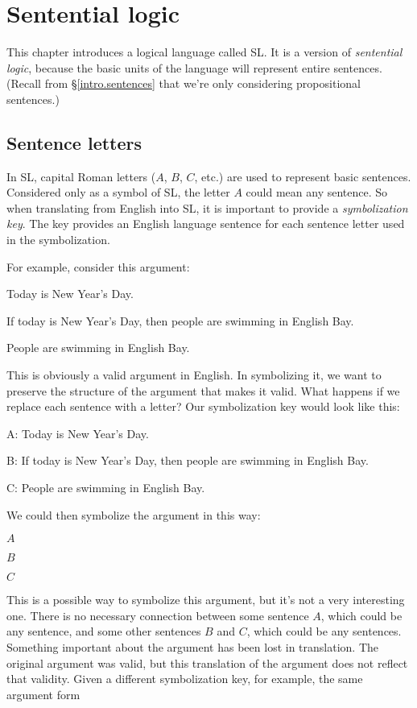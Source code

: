 \chapter{Sentential logic}
\label{ch.SL}




This chapter introduces a logical language called SL. It is a version of \emph{sentential logic}, because the basic units of the language will represent entire sentences. (Recall from \S\ref{intro.sentences} that we're only considering propositional sentences.)



\section{Sentence letters}
In SL, capital Roman letters ($A$, $B$, $C$, etc.) are used to represent basic sentences. Considered only as a symbol of SL, the letter $A$ could mean any sentence. So when translating from English into SL, it is important to provide a \emph{symbolization key}. The key provides an English language sentence for each sentence letter used in the symbolization.

For example, consider this argument:
\begin{earg}
\item[] Today is New Year's Day.
\item[] If today is New Year's Day, then people are swimming in English Bay.
\item[\therefore] People are swimming in English Bay.
\end{earg}

This is obviously a valid argument in English. In symbolizing it, we want to preserve the structure of the argument that makes it valid.
What happens if we replace each sentence with a letter? Our symbolization key would look like this:

\begin{ekey}
\item[A:]Today is New Year's Day.
\item[B:]If today is New Year's Day, then people are swimming in English Bay.
\item[C:]People are swimming in English Bay.
\end{ekey}

We could then symbolize the argument in this way:
\begin{earg}
\item[] $A$
\item[] $B$
\item[\therefore] $C$
\end{earg}
This is a possible way to symbolize this argument, but it's not a very interesting one. There is no necessary connection between some sentence $A$, which could be any sentence, and some other sentences $B$ and $C$, which could be any sentences. Something important about the argument has been lost in translation. The original argument was valid, but this translation of the argument does not reflect that validity. Given a different symbolization key, for example, the same argument form 

